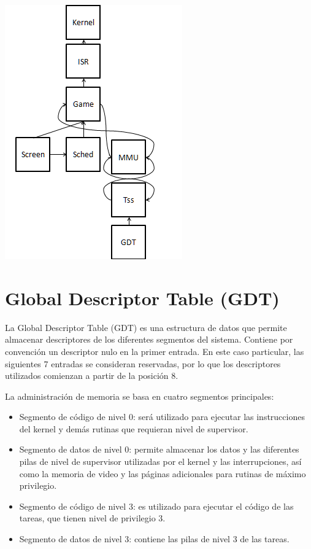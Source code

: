 \documentclass[a4paper]{article}
\begin{document}
\smallskip
\includegraphics{imagenes/Includes.png}

\section{Global Descriptor Table (GDT)}
La Global Descriptor Table (GDT) es una estructura de datos que permite almacenar descriptores de los diferentes segmentos del sistema. Contiene por convención un descriptor nulo en la primer entrada. En este caso particular, las siguientes 7 entradas se consideran reservadas, por lo que los descriptores utilizados comienzan a partir de la posición 8.

La administración de memoria se basa en cuatro segmentos principales:
\begin{itemize}
\item Segmento de código de nivel 0: será utilizado para ejecutar las instrucciones del kernel y demás rutinas que requieran nivel de supervisor.
\item Segmento de datos de nivel 0: permite almacenar los datos y las diferentes pilas de nivel de supervisor utilizadas por el kernel y las interrupciones, así como la memoria de video y las páginas adicionales para rutinas de máximo privilegio.
\item Segmento de código de nivel 3: es utilizado para ejecutar el código de las tareas, que tienen nivel de privilegio 3.
\item Segmento de datos de nivel 3: contiene las pilas de nivel 3 de las tareas.
\end{itemize}
\end{document}
